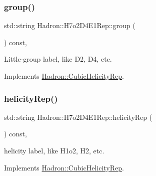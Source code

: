 \mbox{\label{structHadron_1_1H7o2D4E1Rep_ad2f4770cf61bbb361907c5347106cf14}} 
\subsubsection{\texorpdfstring{group()}{group()}\hspace{0.1cm}{\footnotesize\ttfamily [5/5]}}
{\footnotesize\ttfamily std\+::string Hadron\+::\+H7o2\+D4\+E1\+Rep\+::group (\begin{DoxyParamCaption}{ }\end{DoxyParamCaption}) const\hspace{0.3cm}{\ttfamily [inline]}, {\ttfamily [virtual]}}

Little-\/group label, like D2, D4, etc. 

Implements \mbox{\hyperlink{structHadron_1_1CubicHelicityRep_a101a7d76cd8ccdad0f272db44b766113}{Hadron\+::\+Cubic\+Helicity\+Rep}}.

\mbox{\label{structHadron_1_1H7o2D4E1Rep_adb6d012951f61d6cf35b8c9ad1df0435}} 
\subsubsection{\texorpdfstring{helicityRep()}{helicityRep()}\hspace{0.1cm}{\footnotesize\ttfamily [1/3]}}
{\footnotesize\ttfamily std\+::string Hadron\+::\+H7o2\+D4\+E1\+Rep\+::helicity\+Rep (\begin{DoxyParamCaption}{ }\end{DoxyParamCaption}) const\hspace{0.3cm}{\ttfamily [inline]}, {\ttfamily [virtual]}}

helicity label, like H1o2, H2, etc. 

Implements \mbox{\hyperlink{structHadron_1_1CubicHelicityRep_af1096946b7470edf0a55451cc662f231}{Hadron\+::\+Cubic\+Helicity\+Rep}}.

\mbox{\label{structHadron_1_1H7o2D4E1Rep_adb6d012951f61d6cf35b8c9ad1df0435}} 
